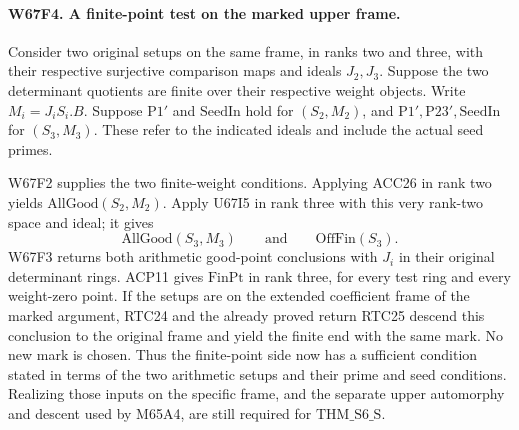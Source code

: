 \paragraph{W67F4. A finite-point test on the marked upper frame.}
Consider two original setups on the same frame, in ranks two and
three, with their respective surjective comparison maps and ideals
$J_2,J_3$. Suppose the two determinant quotients are finite over
their respective weight objects. Write $M_i=J_iS_i.B$. Suppose
$\mathrm{P1}'$ and $\mathrm{SeedIn}$ hold for $(S_2,M_2)$, and
$\mathrm{P1}',\mathrm{P23}',\mathrm{SeedIn}$ for $(S_3,M_3)$.
These refer to the indicated ideals and include the actual seed primes.

W67F2 supplies the two finite-weight conditions. Applying ACC26 in
rank two yields $\mathrm{AllGood}(S_2,M_2)$. Apply U67I5 in rank
three with this very rank-two space and ideal; it gives
\[
  \mathrm{AllGood}(S_3,M_3)\qquad\text{and}\qquad\mathrm{OffFin}(S_3).
\]
W67F3 returns both arithmetic good-point conclusions with $J_i$ in
their original determinant rings. ACP11 gives $\mathrm{FinPt}$
in rank three, for every test ring and every weight-zero point.
If the setups are on the extended coefficient frame of the marked
argument, RTC24 and the already proved return RTC25 descend this
conclusion to the original frame and yield the finite end with the
same mark. No new mark is chosen. Thus the finite-point side now has
a sufficient condition stated in terms of the two arithmetic setups
and their prime and seed conditions. Realizing those inputs on the
specific frame, and the separate upper automorphy and descent used
by M65A4, are still required for $\mathrm{THM\_S6\_S}$.

